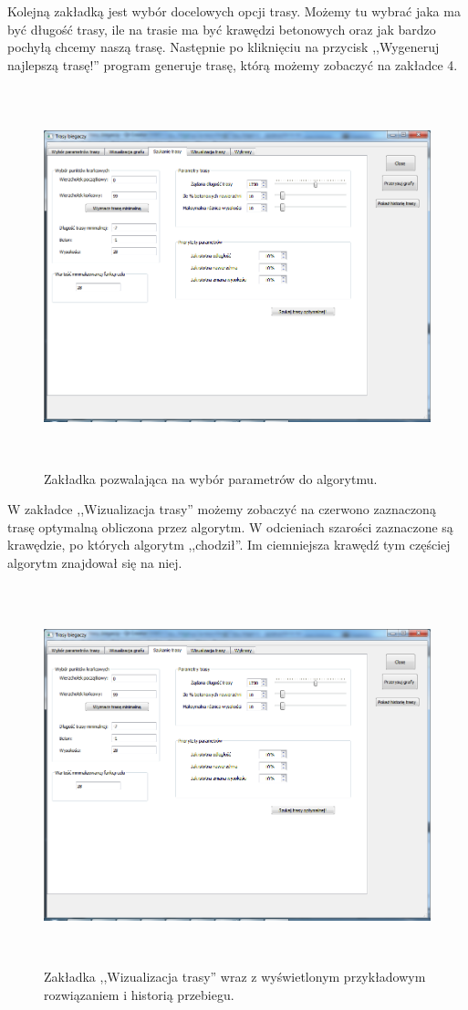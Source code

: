 \documentclass[12pt,a4paper]{article}
\begin{document}
Kolejną zakładką jest wybór docelowych opcji trasy. Możemy tu wybrać jaka ma być długość trasy, ile na trasie ma być krawędzi betonowych oraz jak bardzo pochyłą chcemy naszą trasę. Następnie po kliknięciu na przycisk ,,Wygeneruj najlepszą trasę!'' program generuje trasę, którą możemy zobaczyć na zakładce 4.
\begin{figure}[!h]
	\centering
	\includegraphics[height=110mm]{./ilustracje/screen3.png}
	\caption{Zakładka pozwalająca na wybór parametrów do algorytmu.}
\end{figure}
W zakładce ,,Wizualizacja trasy'' możemy zobaczyć na czerwono zaznaczoną trasę optymalną obliczona przez algorytm. W odcieniach szarości zaznaczone są krawędzie, po których algorytm ,,chodził''. Im ciemniejsza krawędź tym częściej algorytm znajdował się na niej.
\begin{figure}[!h]
	\centering
	\includegraphics[height=110mm]{./ilustracje/screen3.png}
	\caption{Zakładka ,,Wizualizacja trasy'' wraz z wyświetlonym przykładowym rozwiązaniem i historią przebiegu.}
\end{figure}
\end{document}
